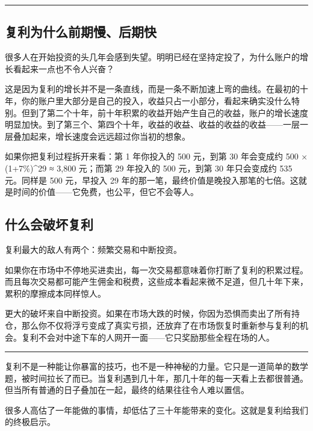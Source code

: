 \documentclass[a4paper,11pt,oneside,fontset=none,UTF8,zihao=-4]{ctexbook}
\begin{document}
\begin{center}{\color{dh-bronze}\rule{0.2\textwidth}{0.5pt}}\end{center}

\subsection{复利为什么前期慢、后期快}\label{ux590dux5229ux4e3aux4ec0ux4e48ux524dux671fux6162ux540eux671fux5feb}

很多人在开始投资的头几年会感到失望。明明已经在坚持定投了，为什么账户的增长看起来一点也不令人兴奋？

这是因为复利的增长并不是一条直线，而是一条不断加速上弯的曲线。在最初的十年，你的账户里大部分是自己的投入，收益只占一小部分，看起来确实没什么特别。但到了第二个十年，前十年积累的收益开始产生自己的收益，账户的增长速度明显加快。到了第三个、第四个十年，收益的收益、收益的收益的收益------一层一层叠加起来，增长速度会远远超过你当初的想象。

如果你把复利过程拆开来看：第 1 年你投入的 500 元，到第 30 年会变成约 500
× (1+7\%)\^{}29 ≈ 3,800 元；而第 29 年投入的 500 元，到第 30
年只会变成约 535 元。同样是 500 元，早投入 29
年的那一笔，最终价值是晚投入那笔的七倍。这就是时间的价值------它免费，也公平，但它不会等人。

\subsection{什么会破坏复利}\label{ux4ec0ux4e48ux4f1aux7834ux574fux590dux5229}

复利最大的敌人有两个：频繁交易和中断投资。

如果你在市场中不停地买进卖出，每一次交易都意味着你打断了复利的积累过程。而且每次交易都可能产生佣金和税费，这些成本看起来微不足道，但几十年下来，累积的摩擦成本同样惊人。

更大的破坏来自中断投资。如果在市场大跌的时候，你因为恐惧而卖出了所有持仓，那么你不仅将浮亏变成了真实亏损，还放弃了在市场恢复时重新参与复利的机会。复利不会对中途下车的人网开一面------它只奖励那些全程在场的人。

\begin{center}{\color{dh-bronze}\rule{0.2\textwidth}{0.5pt}}\end{center}

复利不是一种能让你暴富的技巧，也不是一种神秘的力量。它只是一道简单的数学题，被时间拉长了而已。当复利遇到几十年，那几十年的每一天看上去都很普通。但当所有普通的日子叠加在一起，最终的结果往往令人难以置信。

很多人高估了一年能做的事情，却低估了三十年能带来的变化。这就是复利给我们的终极启示。
\end{document}

